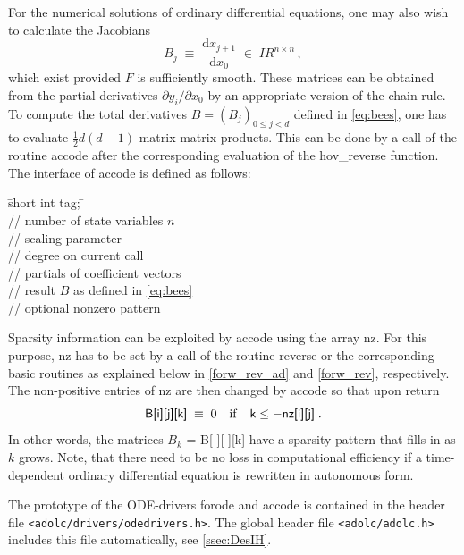 \documentclass[11pt,twoside]{article}
\begin{document}
For the numerical solutions of ordinary differential equations,
one may also wish to calculate the Jacobians
\begin{equation} 
\label{eq:bees}
B_j \; \equiv \; \frac{\mbox{d}x_{j+1}}{\mbox{d} x_0}\;\in\;{I\!\!R}^{n \times n}\, , 
\end{equation}
which exist provided $F$ is sufficiently smooth. These matrices can
be obtained from the partial derivatives $\partial y_i/\partial x_0$
by an appropriate version of the chain rule.
To compute the total derivatives $B = (B_j)_{0\leq j <d}$
defined in \eqref{eq:bees}, one has to evaluate $\frac{1}{2}d(d-1)$
matrix-matrix products. This can be done by a call of the routine {\sf accode} after the
corresponding evaluation of the {\sf hov\_reverse} function. The interface of
{\sf accode} is defined as follows: 
%
\begin{tabbing}
\hspace{0.5in}\={\sf short int tag;} \hspace{1.1in}\= \kill    %
\\
                 \> // number of state variables $n$ \\
            \> // scaling parameter\\
               \> // degree on current call\\
   \> // partials of coefficient vectors\\
   \> // result $B$ as defined in \eqref{eq:bees}\\
        \> // optional nonzero pattern 
\end{tabbing}
%
Sparsity information can be exploited by {\sf accode} using the array {\sf
nz}. For this purpose, {\sf nz} has to be set by a call of the routine {\sf
reverse} or the corresponding basic routines as explained below in
\autoref{forw_rev_ad} and \autoref{forw_rev}, respectively. The
non-positive entries of {\sf nz} are then changed by {\sf accode} so that upon
return 
\[
  \mbox{{\sf B[i][j][k]}} \; \equiv \; 0 \quad {\rm if} \quad \mbox{\sf k} \leq \mbox{\sf $-$nz[i][j]}\; . 
\]
In other words, the matrices $B_k$ = {\sf B[ ][ ][k]} have a
sparsity pattern that fills in as $k$ grows. Note, that there need to be no
loss in computational efficiency if a time-dependent ordinary differential equation 
is rewritten in autonomous form. 

The prototype of the ODE-drivers {\sf forode} and {\sf accode} is contained in the header file
\verb=<adolc/drivers/odedrivers.h>=. The global header file
\verb=<adolc/adolc.h>= 
includes this file automatically, see \autoref{ssec:DesIH}.
\end{document}
